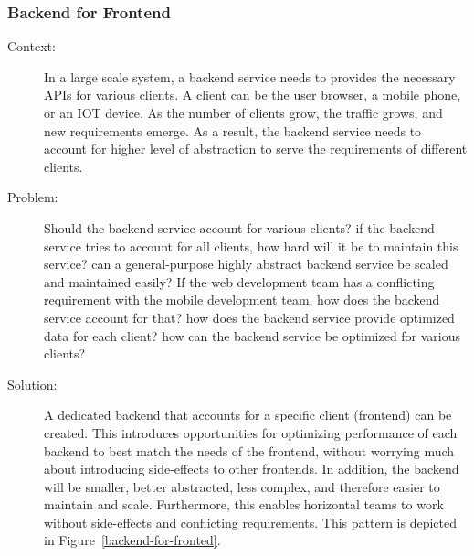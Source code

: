 \documentclass{bmcart}
\begin{document}
\subsubsection{Backend for Frontend}

\begin{description}
  \item[Context:] In a large scale system, a backend service needs to provides the necessary APIs for various clients. A client can be the user browser, a mobile phone, or an IOT device. As the number of clients grow, the traffic grows, and new requirements emerge. As a result, the backend service needs to account for higher level of abstraction to serve the requirements of different clients. 
  \item[Problem:] Should the backend service account for various clients? if the backend service tries to account for all clients, how hard will it be to maintain this service? can a general-purpose highly abstract backend service be scaled and maintained easily? If the web development team has a conflicting requirement with the mobile development team, how does the backend service account for that? how does the backend service provide optimized data for each client? how can the backend service be optimized for various clients? 
  \item[Solution:] A dedicated backend that accounts for a specific client (frontend) can be created. This introduces opportunities for optimizing performance of each backend to best match the needs of the frontend, without worrying much about introducing side-effects to other frontends. In addition, the backend will be smaller, better abstracted, less complex, and therefore easier to maintain and scale. Furthermore, this enables horizontal teams to work without side-effects and conflicting requirements. This pattern is depicted in Figure~\ref{backend-for-fronted}.      
\end{description}


\end{document}
